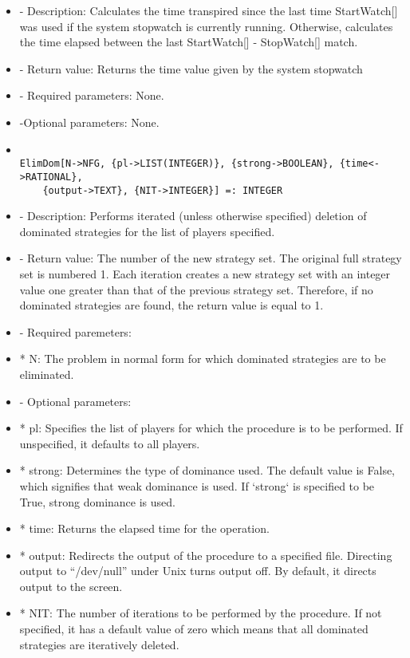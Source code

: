 \begin{itemize}
\bd
\item
- Description:  Calculates the time transpired since the last time 
StartWatch[] was used if the system stopwatch is currently running.
Otherwise, calculates the time elapsed between the last StartWatch[] -
StopWatch[] match.
\item
- Return value:  Returns the time value given by the system stopwatch
\item
- Required parameters:  None.
\item   
-Optional parameters:  None.
\ed

\item
\begin{verbatim}

ElimDom[N->NFG, {pl->LIST(INTEGER)}, {strong->BOOLEAN}, {time<->RATIONAL},
	{output->TEXT}, {NIT->INTEGER}] =: INTEGER
\end{verbatim}

\bd
\item
- Description:  Performs iterated (unless otherwise specified) deletion 
of dominated strategies for the list of players specified.  
\item  
- Return value:  The number of the new strategy set.  The original full
strategy set is numbered 1.  Each iteration creates a new strategy set
with an integer value one greater than that of the previous strategy 
set.  Therefore, if no dominated strategies are found, the return value
is equal to 1.
\item
- Required paremeters:
	
\bd
\item
*  N:  The problem in normal form for which dominated strategies are
to be eliminated.
\ed

\item
- Optional parameters:

\bd
\item
*  pl:  Specifies the list of players for which the procedure is to
be performed.  If unspecified, it defaults to all players. 
\item
*  strong:  Determines the type of dominance used.  The default value
is False, which signifies that weak dominance is used.  If `strong` 
is specified to be True, strong dominance is used.  
\item
*  time:  Returns the elapsed time for the operation.
\item
*  output:  Redirects the output of the procedure to a specified 
file.  Directing output to ``/dev/null'' under Unix turns 
output off.  By default, it directs output to the screen.
\item
*  NIT:  The number of iterations to be performed by the procedure.
If not specified, it has a default value of zero which means 
that all dominated strategies are iteratively deleted.
\ed
\ed


\end{itemize}
